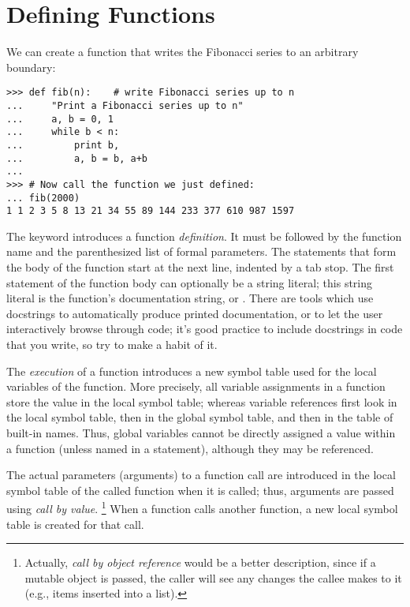 \documentclass{manual}
\begin{document}
\section{Defining Functions}
\label{functions}

We can create a function that writes the Fibonacci series to an
arbitrary boundary:

\begin{verbatim}
>>> def fib(n):    # write Fibonacci series up to n
...     "Print a Fibonacci series up to n"
...     a, b = 0, 1
...     while b < n:
...         print b,
...         a, b = b, a+b
... 
>>> # Now call the function we just defined:
... fib(2000)
1 1 2 3 5 8 13 21 34 55 89 144 233 377 610 987 1597
\end{verbatim}

The keyword  introduces a function \emph{definition}.  It
must be followed by the function name and the parenthesized list of
formal parameters.  The statements that form the body of the function
start at the next line, indented by a tab stop.  The first statement
of the function body can optionally be a string literal; this string
literal is the function's documentation string, or .
There are tools which use docstrings to automatically produce printed
documentation, or to let the user interactively browse through code;
it's good practice to include docstrings in code that you write, so
try to make a habit of it.

The \emph{execution} of a function introduces a new symbol table used
for the local variables of the function.  More precisely, all variable
assignments in a function store the value in the local symbol table;
whereas variable references first look in the local symbol table, then
in the global symbol table, and then in the table of built-in names.
Thus,  global variables cannot be directly assigned a value within a
function (unless named in a  statement), although
they may be referenced.

The actual parameters (arguments) to a function call are introduced in
the local symbol table of the called function when it is called; thus,
arguments are passed using \emph{call by value}.%
\footnote{
         Actually, \emph{call by object reference} would be a better
         description, since if a mutable object is passed, the caller
         will see any changes the callee makes to it (e.g., items
         inserted into a list).
}
When a function calls another function, a new local symbol table is
created for that call.
\end{document}
